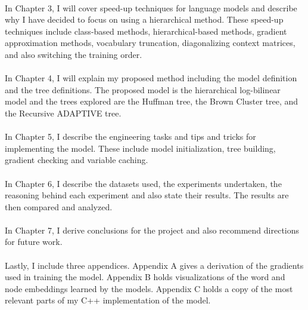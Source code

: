 \paragraph{}
In Chapter 3, I will cover speed-up techniques for language models and describe why I have decided to focus on using a hierarchical method. These speed-up techniques include class-based methods, hierarchical-based methods, gradient approximation methods, vocabulary truncation, diagonalizing context matrices, and also switching the training order.

\paragraph{}
In Chapter 4, I will explain my proposed method including the model definition and the tree definitions. The proposed model is the hierarchical log-bilinear model and the trees explored are the Huffman tree, the Brown Cluster tree, and the Recursive ADAPTIVE tree.

\paragraph{}
In Chapter 5, I describe the engineering tasks and tips and tricks for implementing the model. These include model initialization, tree building, gradient checking and variable caching.

\paragraph{}
In Chapter 6, I describe the datasets used, the experiments undertaken, the reasoning behind each experiment and also state their results. The results are then compared and analyzed. 

\paragraph{}
In Chapter 7, I derive conclusions for the project and also recommend directions for future work.

\paragraph{}
Lastly, I include three appendices. Appendix A gives a derivation of the gradients used in training the model. Appendix B holds visualizations of the word and node embeddings learned by the models. Appendix C holds a copy of the most relevant parts of my C++ implementation of the model.
